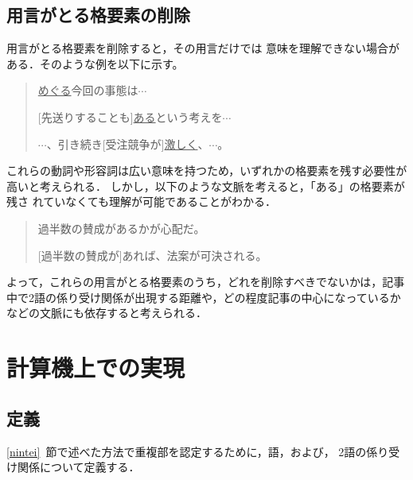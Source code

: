 \subsection{用言がとる格要素の削除} \label{sakujo_yougen}
用言がとる格要素を削除すると，その用言だけでは
意味を理解できない場合がある．そのような例を以下に示す。
\vspace{5mm}\begin{quote}\label{rei:rei11}
\hspace*{-1em}{\bf 例10：}\par
 [台湾海峡を]\underline{めぐる}今回の事態は$\cdots$

 [先送りすることも]\underline{ある}という考えを$\cdots$



  $\cdots$、引き続き[受注競争が]\underline{激しく}、$\cdots$。
\end{quote}\vspace{5mm}
これらの動詞や形容詞は広い意味を持つため，いずれかの格要素を残す必要性が
高いと考えられる．
しかし，以下のような文脈を考えると，「ある」の格要素が残さ
れていなくても理解が可能であることがわかる．
\vspace{5mm}\begin{quote}\label{rei:rei12}
\hspace*{-1em}{\bf 例11：}\par
 過半数の賛成があるかが心配だ。

 [過半数の賛成が]あれば、法案が可決される。
\end{quote}\vspace{5mm}
よって，これらの用言がとる格要素のうち，どれを削除すべきでないかは，記事
中で2語の係り受け関係が出現する距離や，どの程度記事の中心になっているか
などの文脈にも依存すると考えられる．

\section{計算機上での実現} \label{jitsugen}
\subsection{定義} \label{jitsu_teigi}
\ref{nintei}~節で述べた方法で重複部を認定するために，語，および，
2語の係り受け関係について定義する．
